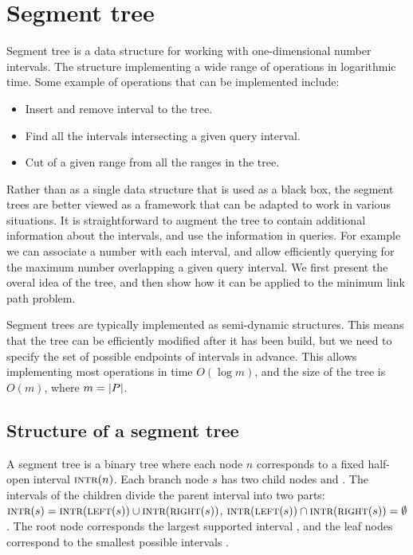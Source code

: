 \documentclass[english,gradu]{tktltiki2018}
\begin{document}
\section{Segment tree}\label{sec:segtree}

Segment tree is a data structure for working with one-dimensional number intervals.
The structure implementing a wide range of operations in logarithmic time.
Some example of operations that can be implemented include:
\begin{itemize}
	\item Insert and remove interval to the tree.
	\item Find all the intervals intersecting a given query interval.
	\item Cut of a given range from all the ranges in the tree.
\end{itemize}

Rather than as a single data structure that is used as a black box, the segment trees are better viewed as a framework that can be adapted to work in various situations.
It is straightforward to augment the tree to contain additional information about the intervals, and use the information in queries.
For example we can associate a number with each interval, and allow efficiently querying for the maximum number overlapping a given query interval.
We first present the overal idea of the tree, and then show how it can be applied to the minimum link path problem.

Segment trees are typically implemented as semi-dynamic structures.
This means that the tree can be efficiently modified after it has been build, but we need to specify the set of possible endpoints \epts of intervals in advance.
This allows implementing most operations in time $O(\log m)$, and the size of the tree is $O(m)$, where $m=\left |P\right |$.

\subsection{Structure of a segment tree}

A segment tree is a binary tree where each node $n$ corresponds to a fixed half-open interval $\textsc{intr}(n)$.
Each branch node $s$ has two child nodes  and .
The intervals of the children divide the parent interval into two parts:
$\textsc{intr}(s)=\textsc{intr}(\textsc{left}(s))\cup\textsc{intr}(\textsc{right}(s))$, $\textsc{intr}(\textsc{left}(s))\cap\textsc{intr}(\textsc{right}(s))=\emptyset$.
The root node corresponds the largest supported interval \range{\epts[1]}{\epts[m]}, and the leaf nodes correspond to the smallest possible intervals \range{\epts[i]}{\epts[i+1]}.
\end{document}
